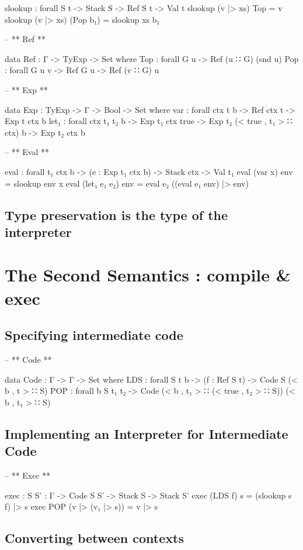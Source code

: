 \documentclass[paper=a4, fontsize=11pt]{scrartcl} %
\numberwithin{equation}{section} %
\numberwithin{figure}{section} %
\numberwithin{table}{section} %
\begin{document}
slookup : forall {S t} -> Stack S -> Ref S t -> Val t
slookup (v |> xs) Top = v
slookup (v |> xs) (Pop b₁) = slookup xs b₁

-- ** Ref **

data Ref : Γ -> TyExp -> Set where
 Top : forall {G u} -> Ref (u ∷ G) (snd u)
 Pop : forall {G u v} -> Ref G u -> Ref (v ∷ G) u

-- ** Exp **

data Exp : TyExp -> Γ -> Bool -> Set where
  var  : forall {ctx t b} -> Ref ctx t -> Exp t ctx b
  let₁ : forall {ctx t₁ t₂ b} -> Exp t₁ ctx true -> Exp t₂ (< true , t₁ >  ∷ ctx) b -> Exp t₂ ctx b


-- ** Eval **

eval : forall {t₁ ctx b} -> (e : Exp t₁ ctx b) -> Stack ctx -> Val t₁
eval (var x) env = slookup env x
eval (let₁ e₁ e₂) env = eval e₂ ((eval e₁ env) |> env)

\subsection{Type preservation is the type of the interpreter}
\section{The Second Semantics : compile \& exec}

\subsection{Specifying intermediate code}

-- ** Code **

data Code : Γ -> Γ -> Set where
	LDS   : forall {S t b} -> (f : Ref S t) -> Code S (< b , t > ∷ S)
    POP   : forall {b S t₁ t₂} -> Code (< b , t₁ > ∷ (< true , t₂ > ∷ S)) (< b , t₁ > ∷ S)


\subsection{Implementing an Interpreter for Intermediate Code}

-- ** Exec **

exec : {S S' : Γ} -> Code S S' -> Stack S -> Stack S'
exec (LDS f) s = (slookup s f) |> s
exec POP (v |> (v₁ |> s)) = v |> s

\subsection{Converting between contexts}
\end{document}
